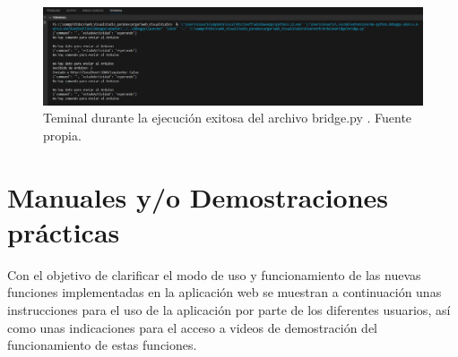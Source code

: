 \begin{enumerate}
\begin{itemize}
\begin{figure}[h]
                \includegraphics[width=1\textwidth]{img/bridgeejecutando.png}
                \caption{Teminal durante la ejecución exitosa del archivo bridge.py . Fuente propia.}
                \label{fig:bridgeejecutando}
            \end{figure}
    \end{itemize}
\end{enumerate}
\section{Manuales y/o Demostraciones prácticas}
Con el objetivo de clarificar el modo de uso y funcionamiento de las nuevas funciones implementadas en la aplicación web se muestran a continuación unas instrucciones para el uso de la aplicación por parte de los diferentes usuarios, así como unas indicaciones para el acceso a videos de demostración del funcionamiento de estas funciones.
